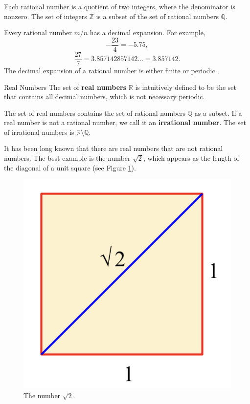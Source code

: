 Each rational number is a quotient of two integers, where the denominator is nonzero. The set of integers $\mathbb{Z}$ is a subset of the set of rational numbers $\mathbb{Q}$.

Every rational number $m/n$ has a decimal expansion. For example, 
\[-\frac{23}{4}=-5.75,\]
\[\frac{27}{7}=3.857142857142\ldots=3.\dot{8}5714\dot{2}.\]
The decimal expansion of a rational number is either finite or periodic.

\begin{definition}{Real Numbers}
The set of {\bf real numbers} $\mathbb{R}$ is intuitively defined to be the set that contains all decimal numbers, which is not necessary periodic. 
\end{definition}

The set of real numbers contains the set of rational numbers $\mathbb{Q}$ as a subset. If a real number is not a rational number, we call it an {\bf irrational number}. The set of irrational numbers is $\mathbb{R}\setminus\mathbb{Q}$.

 

It has been long known that there are real numbers that are not   rational numbers. The best example is the number $\sqrt{2}$, which appears as the length of the diagonal of a unit square (see Figure \ref{figure1}).

\begin{figure}[ht]
\centering
\includegraphics[scale=0.2]{Picture1.png}

\caption{The number $\sqrt{2}$.}\label{figure1}
\end{figure}




